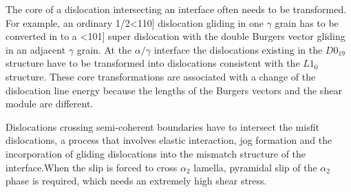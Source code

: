 \documentclass[journal,article,submit,moreauthors,pdftex,10pt,a4paper]{Definitions/mdpi}
\begin{document}
The core of  a dislocation intersecting an interface often needs to be transformed. For example, an ordinary 1/2<110] dislocation gliding in one $\gamma$ grain has to be converted in to a <101] super dislocation with the double Burgers vector gliding in an adjacent $\gamma$ grain. At the $\alpha/\gamma$ interface the dislocations existing in the $D0_{19}$ structure have to be transformed into dislocations consistent with the $L1_0$structure. These core transformations are associated with a change of the dislocation line energy because the lengths of the Burgers vectors and the shear module are different.
	
Dislocations crossing semi-coherent boundaries have to intersect the misfit dislocations, a process that involves elastic interaction, jog formation and the incorporation of gliding dislocations into the mismatch structure of the interface.When the slip is forced to cross $\alpha_2$ lamella, pyramidal slip of the $\alpha_2$ phase is required, which needs an extremely high shear stress.
	
	
	
	
\end{document}
